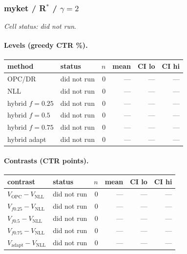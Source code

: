 \documentclass[10pt,a4paper]{article}
\begin{document}
\subsubsection{myket / R$^*$ / $\gamma=2$}
\emph{Cell status: did not run}.
\paragraph{Levels (greedy CTR \%).}
{\centering\small\begin{tabular}{llrrrr}
\toprule method & status & $n$ & mean & CI lo & CI hi \\
\midrule
OPC/DR & did not run & 0 & --- & --- & --- \\
NLL & did not run & 0 & --- & --- & --- \\
hybrid $f{=}0.25$ & did not run & 0 & --- & --- & --- \\
hybrid $f{=}0.5$ & did not run & 0 & --- & --- & --- \\
hybrid $f{=}0.75$ & did not run & 0 & --- & --- & --- \\
hybrid adapt & did not run & 0 & --- & --- & --- \\
\bottomrule\end{tabular}\par}
\paragraph{Contrasts (CTR points).}
{\centering\small\begin{tabular}{llrrrr}
\toprule contrast & status & $n$ & mean & CI lo & CI hi \\
\midrule
$V_{\mathrm{OPC}}-V_{\mathrm{NLL}}$ & did not run & 0 & --- & --- & --- \\
$V_{f0.25}-V_{\mathrm{NLL}}$ & did not run & 0 & --- & --- & --- \\
$V_{f0.5}-V_{\mathrm{NLL}}$ & did not run & 0 & --- & --- & --- \\
$V_{f0.75}-V_{\mathrm{NLL}}$ & did not run & 0 & --- & --- & --- \\
$V_{\mathrm{adapt}}-V_{\mathrm{NLL}}$ & did not run & 0 & --- & --- & --- \\
\bottomrule\end{tabular}\par}
\end{document}
